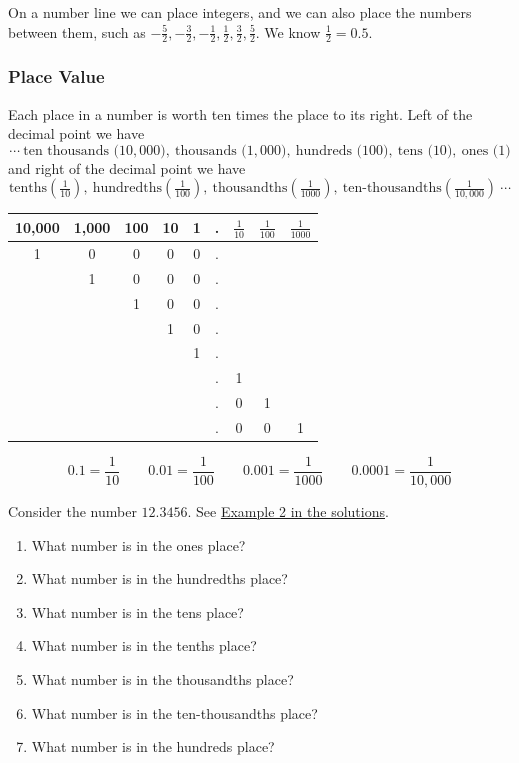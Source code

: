\documentclass[letter]{article}
\newcommand{\exbox}[1]{\fbox{\textbf{Example #1}}}
\newcommand{\chp}{}
\newcommand{\seesol}[1]{See \hyperref[sec:\chp ex#1]{Example #1 in the solutions}.}
\begin{document}
On a number line we can place integers, and we can also place the numbers between them, such as $-\frac52,-\frac32,-\frac12,\frac12,\frac32,\frac52$. We know $\frac12=0.5$.

\begin{center}
\end{center}

\subsubsection*{Place Value}

Each place in a number is worth ten times the place to its right. Left of the decimal point we have
\[\cdots\ \text{ten thousands (}10{,}000),\ \text{thousands (}1{,}000),\ \text{hundreds (}100),\ \text{tens (}10),\ \text{ones (}1)\]
and right of the decimal point we have
\[\text{tenths}\left(\tfrac1{10}\right),\ \text{hundredths}\left(\tfrac1{100}\right),\ \text{thousandths}\left(\tfrac1{1000}\right),\ \text{ten-thousandths}\left(\tfrac1{10{,}000}\right)\ \cdots\]

\begin{center}
\begin{tabular}{c|c|c|c|c|c|c|c|c}
10,000 & 1,000 & 100 & 10 & 1 & . & $\tfrac1{10}$ & $\tfrac1{100}$ & $\tfrac1{1000}$\\
\hline
1 & 0 & 0 & 0 & 0 & . & & &\\
 & 1 & 0 & 0 & 0 & . & & &\\
 & & 1 & 0 & 0 & . & & &\\
 & & & 1 & 0 & . & & &\\
 & & & & 1 & . & & &\\
 & & & & & . & 1 & &\\
 & & & & & . & 0 & 1 &\\
 & & & & & . & 0 & 0 & 1
\end{tabular}
\end{center}
\[0.1=\frac1{10}\qquad0.01=\frac1{100}\qquad0.001=\frac1{1000}\qquad0.0001=\frac1{10{,}000}\]

\exbox{2} Consider the number $12.3456$. \seesol{2}
\begin{enumerate}[label=\alph*.,itemsep=0pt]
  \item What number is in the ones place?
  \item What number is in the hundredths place?
  \item What number is in the tens place?
  \item What number is in the tenths place?
  \item What number is in the thousandths place?
  \item What number is in the ten-thousandths place?
  \item What number is in the hundreds place?
\end{enumerate}
\end{document}
